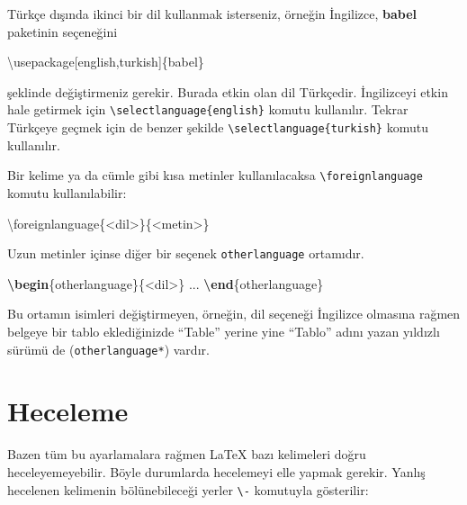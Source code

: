 \documentclass[
  10pt,
]{scrbook}
\newenvironment{Shaded}{\begin{snugshade}}{\end{snugshade}}
\newcommand{\BuiltInTok}[1]{#1}
\newcommand{\ExtensionTok}[1]{#1}
\newcommand{\FunctionTok}[1]{\textcolor[rgb]{0.00,0.00,0.00}{#1}}
\newcommand{\KeywordTok}[1]{\textcolor[rgb]{0.13,0.29,0.53}{\textbf{#1}}}
\newcommand{\NormalTok}[1]{#1}
\theoremstyle{definition}
\theoremstyle{definition}
\theoremstyle{definition}
\theoremstyle{definition}
\theoremstyle{remark}
\begin{document}
Türkçe dışında ikinci bir dil kullanmak isterseniz, örneğin İngilizce, \textbf{babel} paketinin seçeneğini

\begin{Shaded}
\begin{Highlighting}[]
\BuiltInTok{\textbackslash{}usepackage}\NormalTok{[english,turkish]\{}\ExtensionTok{babel}\NormalTok{\}}
\end{Highlighting}
\end{Shaded}

şeklinde değiştirmeniz gerekir. Burada etkin olan dil Türkçedir. İngilizceyi etkin hale getirmek için \texttt{\textbackslash{}selectlanguage\{english\}} komutu kullanılır. Tekrar Türkçeye geçmek için de benzer şekilde \texttt{\textbackslash{}selectlanguage\{turkish\}} komutu kullanılır.

Bir kelime ya da cümle gibi kısa metinler kullanılacaksa \texttt{\textbackslash{}foreignlanguage} komutu kullanılabilir:

\begin{Shaded}
\begin{Highlighting}[]
\FunctionTok{\textbackslash{}foreignlanguage}\NormalTok{\{\textless{}dil\textgreater{}\}\{\textless{}metin\textgreater{}\}}
\end{Highlighting}
\end{Shaded}

Uzun metinler içinse diğer bir seçenek \texttt{otherlanguage} ortamıdır.

\begin{Shaded}
\begin{Highlighting}[]
\KeywordTok{\textbackslash{}begin}\NormalTok{\{}\ExtensionTok{otherlanguage}\NormalTok{\}\{\textless{}dil\textgreater{}\}}
\NormalTok{  ...}
\KeywordTok{\textbackslash{}end}\NormalTok{\{}\ExtensionTok{otherlanguage}\NormalTok{\}}
\end{Highlighting}
\end{Shaded}

Bu ortamın isimleri değiştirmeyen, örneğin, dil seçeneği İngilizce olmasına rağmen belgeye bir tablo eklediğinizde ``Table'' yerine yine ``Tablo'' adını yazan yıldızlı sürümü de (\texttt{otherlanguage*}) vardır.

\hypertarget{heceleme}{%
\section{Heceleme}\label{heceleme}}

Bazen tüm bu ayarlamalara rağmen LaTeX bazı kelimeleri doğru heceleyemeyebilir. Böyle durumlarda hecelemeyi elle yapmak gerekir. Yanlış hecelenen kelimenin bölünebileceği yerler \texttt{\textbackslash{}-} komutuyla gösterilir:
\end{document}
